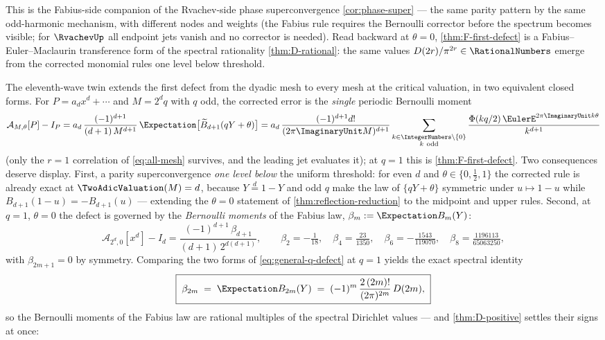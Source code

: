 This is the Fabius-side companion of the Rvachev-side phase
superconvergence \cref{cor:phase-super} --- the same parity pattern by
the same odd-harmonic mechanism, with different nodes and weights (the
Fabius rule requires the Bernoulli corrector before the spectrum
becomes visible; for $\RvachevUp$ all endpoint jets vanish and no corrector is
needed).  Read backward at $\theta=0$, \cref{thm:F-first-defect} is a
Fabius--Euler--Maclaurin transference form of the spectral rationality
\cref{thm:D-rational}: the same values $D(2r)/\pi^{2r}\in\RationalNumbers$ emerge
from the corrected monomial rules one level below threshold.

The eleventh-wave twin extends the first defect from the dyadic mesh
to every mesh at the critical valuation, in two equivalent closed
forms.  For $P=a_dx^{d}+\cdots$ and $M=2^{d}q$ with $q$ odd, the
corrected error is the \emph{single} periodic Bernoulli moment
\begin{equation}
 \mathcal A_{M,\theta}[P]-I_P
 =a_d\,\frac{(-1)^{d+1}}{(d+1)\,M^{d+1}}\,
 \Expectation\bigl[\widetilde B_{d+1}(qY+\theta)\bigr]
 =a_d\,\frac{(-1)^{d+1}d!}{(2\pi\ImaginaryUnit M)^{d+1}}
 \sum_{\substack{k\in\IntegerNumbers\setminus\{0\}\\ k\ \mathrm{odd}}}
 \frac{\Phi(kq/2)\,\EulerE^{2\pi\ImaginaryUnit k\theta}}{k^{d+1}}
 \label{eq:general-q-defect}
\end{equation}
(only the $r=1$ correlation of \eqref{eq:all-mesh} survives, and the
leading jet evaluates it); at $q=1$ this is
\cref{thm:F-first-defect}.  Two consequences deserve display.  First,
a parity superconvergence \emph{one level below} the uniform
threshold: for even $d$ and $\theta\in\{0,\tfrac12,1\}$ the corrected
rule is already exact at $\TwoAdicValuation(M)=d$, because $Y\overset d=1-Y$ and
odd $q$ make the law of $\{qY+\theta\}$ symmetric under
$u\mapsto1-u$ while $B_{d+1}(1-u)=-B_{d+1}(u)$ --- extending the
$\theta=0$ statement of \cref{thm:reflection-reduction} to the
midpoint and upper rules.  Second, at $q=1$, $\theta=0$ the defect is
governed by the \emph{Bernoulli moments} of the Fabius law,
$\beta_m:=\Expectation B_m(Y)$:
\begin{equation}
 \mathcal A_{2^{d},0}[x^{d}]-I_d
 =\frac{(-1)^{d+1}\,\beta_{d+1}}{(d+1)\,2^{d(d+1)}},
 \qquad
 \beta_2=-\tfrac1{18},\quad
 \beta_4=\tfrac{23}{1350},\quad
 \beta_6=-\tfrac{1543}{119070},\quad
 \beta_8=\tfrac{1196113}{65063250},
 \label{eq:beta-defect}
\end{equation}
with $\beta_{2m+1}=0$ by symmetry.  Comparing the two forms of
\eqref{eq:general-q-defect} at $q=1$ yields the exact spectral
identity
\begin{equation}
 \boxed{\;
 \beta_{2m}\;=\;\Expectation B_{2m}(Y)
 \;=\;(-1)^{m}\,\frac{2\,(2m)!}{(2\pi)^{2m}}\,D(2m),\;}
 \label{eq:beta-D}
\end{equation}
so the Bernoulli moments of the Fabius law are rational multiples of
the spectral Dirichlet values --- and \cref{thm:D-positive} settles
their signs at once:

